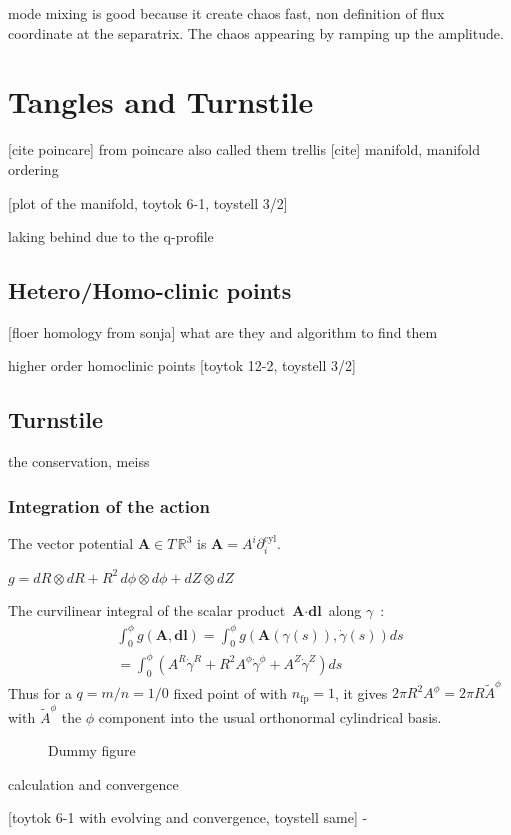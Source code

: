 mode mixing is good because it create chaos fast, non definition of flux coordinate at the separatrix. The chaos appearing by ramping up the amplitude.

\chapter{Tangles and Turnstile}

[cite poincare]
from poincare also called them trellis [cite]
manifold, manifold ordering 

[plot of the manifold, toytok 6-1, toystell 3/2]

laking behind due to the q-profile

\section{Hetero/Homo-clinic points}
[floer homology from sonja]
what are they and algorithm to find them

higher order homoclinic points
[toytok 12-2, toystell 3/2]

\section{Turnstile}

the conservation, meiss

\subsection{Integration of the action}

The vector potential $\textbf{A} \in T\,\mathbb{R}^3$ is $\textbf{A} =  A^i\partial_i^\text{cyl}$.

$g = dR\otimes dR + R^2\,d\phi\otimes d\phi + dZ\otimes dZ$

The curvilinear integral of the scalar product $\textbf{A}\cdot\textbf{dl}$ along $\gamma$~:
\begin{align*}
    \int_0^\phi g(\textbf{A},\textbf{dl}) = \int_0^\phi g(\textbf{A}(\gamma(s)),\dot{\gamma}(s))ds\\ = \int_0^\phi (A^R\dot{\gamma}^R + R^2A^\phi\dot{\gamma}^\phi + A^Z\dot{\gamma}^Z) ds
\end{align*}
Thus for a $q=m/n=1/0$ fixed point of with $n_\text{fp} = 1$, it gives $2\pi R^2A^\phi = 2\pi R\tilde{A}^\phi$ with $\tilde{A}^\phi$ the $\phi$ component into the usual orthonormal cylindrical basis.

\begin{figure}[!ht]
    \hfill
    \caption{Dummy figure}
    \label{fig:turnstile-area-sketches}
\end{figure}

calculation and convergence

[toytok 6-1 with evolving and convergence, toystell same]
-